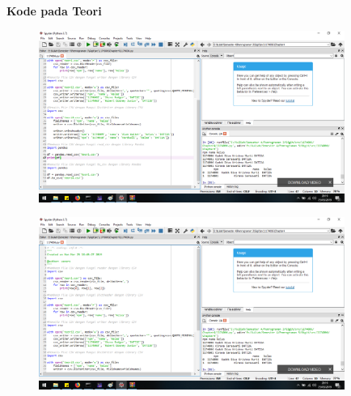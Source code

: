 \textbf{Kode pada Teori}

\begin{figure}[H]
	\includegraphics[width=10cm]{figures/diva/Chapter4/Kode_teori1.png}
	\centering
\end{figure}

\begin{figure}[H]
	\includegraphics[width=10cm]{figures/diva/Chapter4/Kode_teori2.png}
	\centering
\end{figure}


